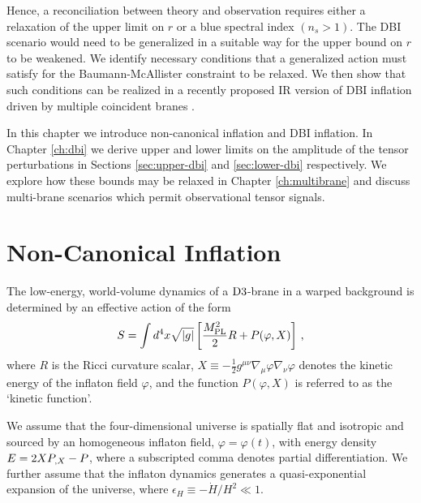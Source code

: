 Hence, a reconciliation between theory and observation 
requires either a relaxation of the upper limit on $r$ or a blue 
spectral index $(n_s >1)$. The DBI scenario would need 
to be generalized in a suitable way for the upper bound on $r$
to be weakened. We identify necessary conditions that a 
generalized action must satisfy for the Baumann-McAllister
 constraint to be relaxed. 
We then show that such conditions can be realized in a recently 
proposed IR version of DBI inflation driven
by multiple coincident branes \cite{thomasward}. 


In this chapter we introduce non-canonical inflation and DBI inflation.
In Chapter \ref{ch:dbi} we derive upper and lower 
limits on the amplitude of the tensor perturbations in Sections \ref{sec:upper-dbi} and  
\ref{sec:lower-dbi} respectively.  
We explore how these bounds may be relaxed in Chapter \ref{ch:multibrane} and discuss multi-brane 
scenarios which permit observational tensor signals. 


% 
% 
\section{Non-Canonical Inflation} 
\label{sec:noncanoninfl}


The low-energy, world-volume dynamics of a 
${\rm D3}$-brane in a warped background is determined 
by an effective action of the form 
% 
\begin{equation}
\label{eq:DBIaction-dbiintro2}
S=\int  d^4x \sqrt{|g|} \left[ \frac{M_{\mathrm{PL}}^2}{2} R 
+ P (\varphi , X) \right] \,,
\end{equation}
% 
where $R$ is the Ricci curvature scalar, 
$X \equiv -\frac{1}{2}g^{\mu \nu}\nabla_\mu \varphi \nabla_\nu \varphi$
denotes the kinetic energy of the inflaton field $\varphi$, and the function  
$P (\varphi , X)$ is referred to as the `kinetic function'.  


We assume that the four-dimensional universe is   
spatially flat and isotropic and sourced by an  
homogeneous inflaton field, $\varphi =\varphi (t)$, with energy 
density $E = 2XP_{,X} - P$, where a subscripted comma denotes partial
differentiation. 
We further assume that the inflaton dynamics  
generates a quasi-exponential expansion of the universe, 
where $\epsilon_H \equiv -\dot{H}/H^2 \ll1$. 

